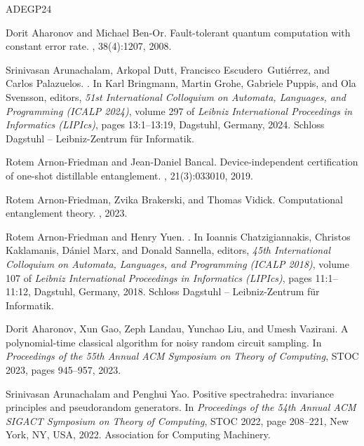 \documentclass[10pt,a4paper]{article}
\theoremstyle{plain}
\theoremstyle{definition}
\newcommand{\1}{\mathbb{1}} %
\begin{document}
\newcommand{\etalchar}[1]{$^{#1}$}
\begin{thebibliography}{ADEGP24}

Dorit Aharonov and Michael Ben-Or.
\newblock Fault-tolerant quantum computation with constant error rate.
, 38(4):1207, 2008.

Srinivasan Arunachalam, Arkopal Dutt, Francisco Escudero~Guti\'{e}rrez, and
  Carlos Palazuelos.
.
\newblock In Karl Bringmann, Martin Grohe, Gabriele Puppis, and Ola Svensson,
  editors, {\em 51st International Colloquium on Automata, Languages, and
  Programming (ICALP 2024)}, volume 297 of {\em Leibniz International
  Proceedings in Informatics (LIPIcs)}, pages 13:1--13:19, Dagstuhl, Germany,
  2024. Schloss Dagstuhl -- Leibniz-Zentrum f{\"u}r Informatik.

Rotem Arnon-Friedman and Jean-Daniel Bancal.
\newblock Device-independent certification of one-shot distillable
  entanglement.
, 21(3):033010, 2019.

Rotem Arnon-Friedman, Zvika Brakerski, and Thomas Vidick.
\newblock Computational entanglement theory.
, 2023.

Rotem Arnon-Friedman and Henry Yuen.
.
\newblock In Ioannis Chatzigiannakis, Christos Kaklamanis, D\'{a}niel Marx, and
  Donald Sannella, editors, {\em 45th International Colloquium on Automata,
  Languages, and Programming (ICALP 2018)}, volume 107 of {\em Leibniz
  International Proceedings in Informatics (LIPIcs)}, pages 11:1--11:12,
  Dagstuhl, Germany, 2018. Schloss Dagstuhl -- Leibniz-Zentrum f{\"u}r
  Informatik.

\bibitem[AGL{\etalchar{+}}23]{aharonov2023polynomial}
Dorit Aharonov, Xun Gao, Zeph Landau, Yunchao Liu, and Umesh Vazirani.
\newblock A polynomial-time classical algorithm for noisy random circuit
  sampling.
\newblock In {\em Proceedings of the 55th Annual ACM Symposium on Theory of
  Computing}, STOC 2023, pages 945--957, 2023.

Srinivasan Arunachalam and Penghui Yao.
\newblock Positive spectrahedra: invariance principles and pseudorandom
  generators.
\newblock In {\em Proceedings of the 54th Annual ACM SIGACT Symposium on Theory
  of Computing}, STOC 2022, page 208–221, New York, NY, USA, 2022.
  Association for Computing Machinery.


\end{thebibliography}
\end{document}
